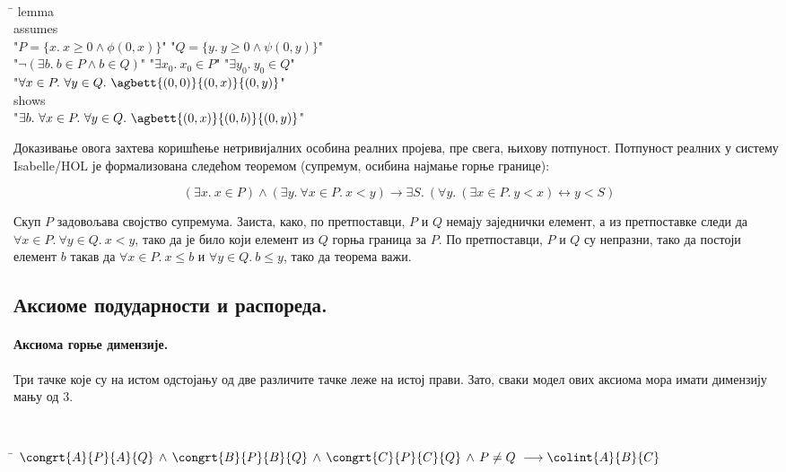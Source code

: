 {\tt
\begin{tabbing}
\hspace{5mm}\=\kill
lemma\\
\>assumes\\
\>"$P = \{x.\ x\ge 0 \wedge \phi(0, x)\}$" "$Q = \{y.\ y\ge 0\wedge \psi(0, y)\}$"\\
\>"$\neg (\exists b.\ b \in P \wedge b \in Q)$" "$\exists x_0.\ x_0 \in P$" "$\exists y_0.\ y_0 \in Q$"\\
\>"$\forall x \in P.\ \forall y \in Q.\ \agbett{(0, 0)}{(0, x)}{(0, y)}$"\\
\>shows\\
\>"$\exists b.\ \forall x \in P.\ \forall y \in Q.\ \agbett{(0, x)}{(0, b)}{(0, y)}$"
\end{tabbing}
}

Доказивање овога захтева коришћење нетривијалних особина реалних
пројева, пре свега, њихову потпуност. Потпуност реалних у систему
Isabelle/HOL је формализована следећом теоремом (супремум, осибина
најмање горње границе):

\vspace{-7mm}
$$(\exists x.\ x \in P) \wedge (\exists y.\ \forall x\in P.\ x < y) \longrightarrow
\exists S.\ (\forall y.\ (\exists x\in P.\ y < x) \leftrightarrow y <
S)$$
\vspace{-7mm}

Скуп $P$ задовољава својство супремума. Заиста, како, по претпоставци,
$P$ и $Q$ немају заједнички елемент, а из претпоставке следи да
$\forall x \in P.\ \forall y \in Q.\ x < y$, тако да је било који
елемент из $Q$ горња граница за $P$. По претпоставци, $P$ и $Q$ су
непразни, тако да постоји елемент $b$ такав да $\forall x \in P.\ x
\leq b$ и $\forall y \in Q.\ b \leq y$, тако да теорема важи.

\subsection{Аксиоме подударности и распореда.}
\paragraph{Аксиома горње димензије.}
Три тачке које су на истом одстојању од две различите тачке леже на
истој прави. Зато, сваки модел ових аксиома мора имати димензију мању
од 3.

{\tt
\begin{tabbing}
\hspace{5mm}\=\kill
$\congrt{A}{P}{A}{Q} \,\wedge\, \congrt{B}{P}{B}{Q} \,\wedge\, \congrt{C}{P}{C}{Q} \,\wedge\,  P \neq Q \ \longrightarrow \colint{A}{B}{C}$
\end{tabbing}
}

